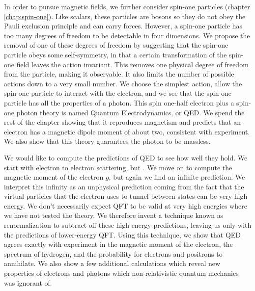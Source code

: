 In order to pursue magnetic fields, we further consider spin-one particles (chapter \ref{chap:spin-one}). Like scalars, these particles are bosons so they do not obey the Pauli exclusion principle and can carry forces. However, a spin-one particle has too many degrees of freedom to be detectable in four dimensions. We propose the removal of one of these degrees of freedom by suggesting that the spin-one particle obeys some self-symmetry, in that a certain transformation of the spin-one field leaves the action invariant. This removes one physical degree of freedom from the particle, making it observable. It also limits the number of possible actions down to a very small number. We choose the simplest action, allow the spin-one particle to interact with the electron, and we see that the spin-one particle has all the properties of a photon. This spin one-half electron plus a spin-one photon theory is named Quantum Electrodynamics, or QED. We spend the rest of the chapter showing that it reproduces magnetism and predicts that an electron has a magnetic dipole moment of about two, consistent with experiment. We also show that this theory guarantees the photon to be massless.

We would like to compute the predictions of QED to see how well they hold. We start with electron to electron scattering, but . We move on to compute the magnetic moment of the electron $g$, but again we find an infinite prediction. We interpret this infinity as an unphysical prediction coming from the fact that the virtual particles that the electron uses to tunnel between states can be very high energy. We don't necessarily expect QFT to be valid at very high energies where we have not tested the theory. We therefore invent a technique known as renormalization to subtract off these high-energy predictions, leaving us only with the predictions of lower-energy QFT. Using this technique, we show that QED agrees exactly with experiment in the magnetic moment of the electron, the spectrum of hydrogen, and the probability for electrons and positrons to annihilate. We also show a few additional calculations which reveal new properties of electrons and photons which non-relativistic quantum mechanics was ignorant of.

